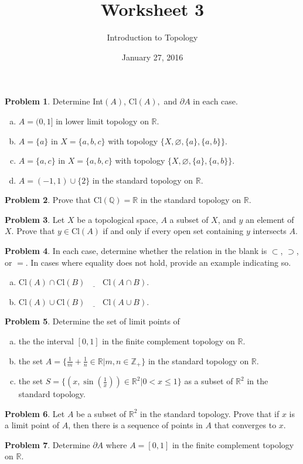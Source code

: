 \documentclass{amsart}
\newcommand{\+}[1]{\ensuremath{\mathbf{#1}}}
\newcommand{\Z}{{\mathbb Z}}
\newcommand{\Q}{{\mathbb Q}}
\newcommand{\R}{{\mathbb R}}
\renewcommand{\emptyset}{\varnothing}
\theoremstyle{definition}
\newtheorem{prob}{Problem}
\begin{document}
\title{Worksheet 3}
\date{January 27, 2016}
\author{Introduction to Topology}

\maketitle



\begin{prob}
 Determine Int$(A)$, Cl$(A),$ and $\partial A$ in each case.
\begin{enumerate}[(a)]
 \item $A = (0,1]$ in lower limit topology on $\R$.
 \item $A =\{a\}$ in $X = \{a,b,c\}$ with topology $\{X, \emptyset, \{a\}, \{a,b\}\}$.
  \item $A =\{a,c\}$ in $X = \{a,b,c\}$ with topology $\{X, \emptyset, \{a\}, \{a,b\}\}$.
\item $A = (-1,1) \cup \{2\}$ in the standard topology on $\R$.
\end{enumerate}

 \end{prob}


\begin{prob}
Prove that Cl$(\Q)=\R$ in the standard topology on $\R$.
\end{prob}

\begin{prob}
 Let $X$ be a topological space, $A$ a subset of $X$, and $y$ an element of $X$.  Prove that $y \in \text{Cl}(A)$
 if and only if every open set containing $y$ intersects $A$.
\end{prob}


\begin{prob}
 In each case, determine whether the relation in the blank is $\subset$, $\supset$, or $=$.
 In cases where equality does not hold, provide an example indicating so.
 \begin{enumerate}[(a)]
  \item Cl$(A) \cap $Cl$(B)\underline{\phantom{aaaa}}$Cl$(A \cap B)$. 
  \item Cl$(A) \cup $Cl$(B)\underline{\phantom{aaaa}}$Cl$(A \cup B)$. 
 \end{enumerate}
\end{prob}

\begin{prob}
 Determine the set of limit points of
 \begin{enumerate}[(a)]
  \item the the interval $[0,1]$ in the finite complement topology on $\R$.
  \item the set $A = \{\frac{1}{m} + \frac{1}{n} \in \R \vert m,n \in \Z_+\}$ in
  the standard topology on $\R$.
  \item the set $S = \{(x,\sin(\frac{1}{x})) \in \R^2 \vert 0 < x \leq 1\}$ as a subset
  of $\R^2$ in the standard topology.
 \end{enumerate}
\end{prob}



\begin{prob}
 Let $A$ be a subset of $\R^2$ in the standard topology.  Prove that if $x$ is a limit point
 of $A$, then there is a sequence of points in $A$ that converges to $x$.
\end{prob}

\begin{prob}
Determine $\partial A$ where $A = [0,1]$ in the finite complement topology on $\R$.
\end{prob}
\end{document}
